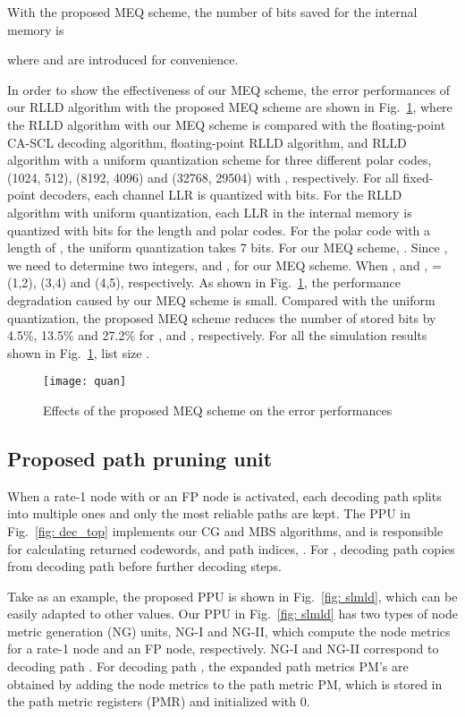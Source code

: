 \documentclass[journal]{IEEEtran}
\begin{document}
With the proposed MEQ scheme, the number of bits saved for the internal memory is

where  and  are introduced for convenience.

In order to show the effectiveness of our MEQ scheme, the error performances of our RLLD algorithm with the proposed MEQ scheme are shown in Fig.~\ref{fig: fer_quan}, where the RLLD algorithm with our MEQ scheme is compared with the floating-point CA-SCL decoding algorithm, floating-point RLLD algorithm, and RLLD algorithm with a uniform quantization scheme for three different polar codes, (1024, 512), (8192, 4096) and (32768, 29504) with , respectively. For all fixed-point decoders, each channel LLR is quantized with  bits. For the RLLD algorithm with uniform quantization, each LLR in the internal memory is quantized with  bits for the length  and  polar codes. For the polar code with a length of , the uniform quantization takes 7 bits. For our MEQ scheme, . Since , we need to determine two integers,  and , for our MEQ scheme. When ,  and ,  = (1,2), (3,4) and (4,5), respectively. As shown in Fig.~\ref{fig: fer_quan}, the performance degradation caused by our MEQ scheme is small. Compared with the uniform quantization, the proposed MEQ scheme reduces the number of stored bits by 4.5\%, 13.5\% and 27.2\% for ,  and , respectively. For all the simulation results shown in Fig.~\ref{fig: fer_quan}, list size .
\begin{figure} [hbt]
\centering
\texttt{[image: quan]}
  \caption{Effects of the proposed MEQ scheme on the error performances}\label{fig: fer_quan}
\end{figure}

\subsection{Proposed path pruning unit} \label{ssec: slmld_archi}

When a rate-1 node with  or an FP node is activated, each decoding path splits into multiple ones and only the  most reliable paths are kept. The PPU in Fig.~\ref{fig: dec_top} implements our CG and MBS algorithms, and is responsible for calculating  returned codewords,  and  path indices, . For , decoding path  copies from decoding path  before further decoding steps.


Take  as an example, the proposed PPU is shown in Fig.~\ref{fig: slmld}, which can be easily adapted to other  values. Our PPU in Fig.~\ref{fig: slmld} has two types of node metric generation (NG) units, NG-I and NG-II, which compute the node metrics for a rate-1 node and an FP node, respectively. NG-I and NG-II correspond to decoding path .
For decoding path , the expanded path metrics PM's are obtained by adding the node metrics to the path metric PM, which is stored in the path metric registers (PMR) and initialized with 0.
\end{document}
